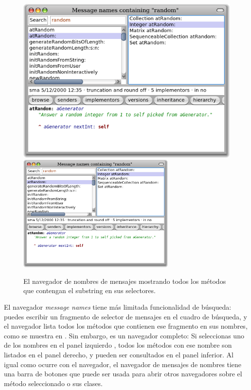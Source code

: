 \documentclass[spanish,a4paper,10pt,twoside]{book}
\begin{document}
\begin{figure}[btp]
	\begin{center}
	\ifluluelse
		{\includegraphics[width=\textwidth]{methodNamesRandom}}
		{\includegraphics[width=0.7\textwidth]{methodNamesRandom}}
	\end{center}
	\caption{El navegador de nombres de mensajes mostrando todos los m\'etodos que contengan el substring  en sus selectores.}
\end{figure}

El navegador \emph{message names} tiene m\'as limitada funcionalidad de b\'usqueda: puedes escribir un fragmento de selector de mensajes en el cuadro de b\'usqueda, y el navegador lista todos los m\'etodos que contienen ese fragmento en sus nombres, como se muestra en .
Sin embargo, es un navegador completo:
Si seleccionas uno de los nombres en el panel izquierdo , todos los m\'etodos con ese nombre son listados en el panel derecho, y pueden ser consultados en el panel inferior.
Al igual como ocurre con el navegador, el navegador de mensajes de nombres tiene una barra de botones que puede ser usada para abrir otros navegadores sobre el m\'etodo seleccionado o sus clases.
\end{document}

